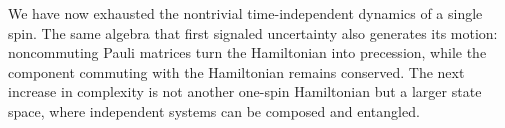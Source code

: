 We have now exhausted the nontrivial time-independent dynamics of a single spin. The same algebra that first signaled uncertainty also generates its motion: noncommuting Pauli matrices turn the Hamiltonian into precession, while the component commuting with the Hamiltonian remains conserved. The next increase in complexity is not another one-spin Hamiltonian but a larger state space, where independent systems can be composed and entangled.
